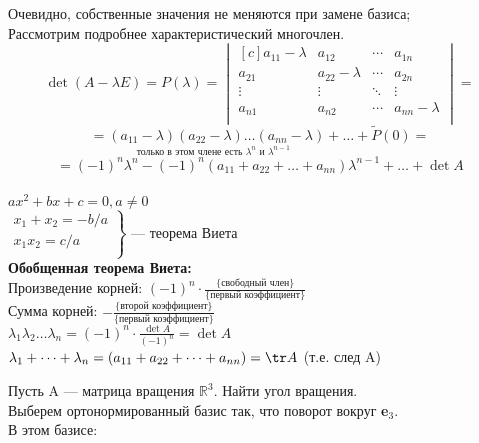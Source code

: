 Очевидно, собственные значения не меняются при замене базиса;\\

Рассмотрим подробнее характеристический многочлен.\\
$$
\det (A-\lambda E)=P(\lambda)=
\begin{vmatrix*}[c]
 a_{11}-\lambda & a_{12} & \cdots & a_{1n}\\
 a_{21} & a_{22}-\lambda & \cdots & a_{2n}\\
 \vdots & \vdots & \ddots & \vdots \\
 a_{n1} & a_{n2} & \cdots & a_{nn}-\lambda\\
\end{vmatrix*}
=
$$
$$
=\underset{\text{только в этом члене есть $\lambda^{n}$ и $\lambda^{n-1}$ }}
{( a_{11}-\lambda)(a_{22}-\lambda)\dots ( a_{nn}-\lambda)} + \dots + \tilde P(0)=
$$
$$
=(-1)^{n}\lambda^{n}-(-1)^{n}( a_{11}+a_{22}+\dots+a_{nn})\lambda^{n-1}+\dots+\det A
$$
\\

$ax^{2}+bx+c=0, a\neq 0$ \\

$\left.
\begin{aligned}
x_{1}+x_{2}=-b/a\\
x_{1}x_{2}=c/a\\
\end{aligned}
\right\}$
--- теорема Виета\\

\textbf{Обобщенная теорема Виета:}\\
Произведение корней: $(-1)^{n}\cdot \frac{\{ \text{свободный член}\}}{\{ \text{первый коэффициент}\}}$\\
Сумма корней: $-\frac{\{ \text{второй коэффициент}\}}{\{ \text{первый коэффициент}\}}$\\
$\lambda_{1}\lambda_{2}\dots \lambda_{n}=(-1)^{n}\cdot \frac{\det A}{(-1)^{n}}=\det A$\\
$\lambda_{1}+ \dots + \lambda_{n}=(a_{11}+a_{22}+\dots+a_{nn})=\tr A$ (т.е. след A)\\

\begin{prim}
Пусть A --- матрица вращения $\mathbb{R}^{3}$. Найти угол вращения.\\

Выберем ортонормированный базис так, что поворот вокруг \textbf{e$_{3}$}.\\
В этом базисе:
\end{prim}